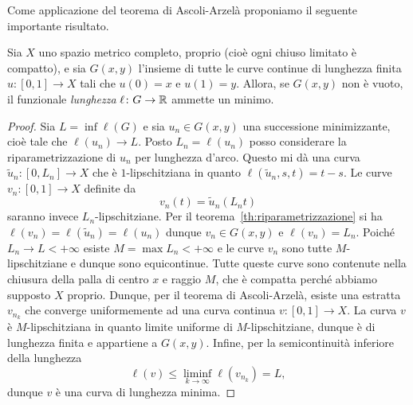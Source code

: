 Come applicazione del teorema di Ascoli-Arzelà
proponiamo il seguente importante risultato.

\begin{theorem}
    Sia $X$ uno spazio metrico completo, proprio 
    (cioè ogni chiuso limitato è compatto), 
    e sia $G(x,y)$ l'insieme di tutte le curve continue di lunghezza finita 
    $u\colon [0,1] \to X$
    tali che $u(0) = x$ e $u(1) = y$.
    Allora, se $G(x,y)$ non è vuoto, il funzionale \emph{lunghezza}
    $\ell\colon G \to {\mathbb R}$ ammette un minimo.
\end{theorem}
\begin{proof}
    Sia $L = \inf\ell(G)$ e sia 
    $u_n\in G(x,y)$ una successione minimizzante,
    cioè tale che $\ell(u_n) \to L$.
    Posto $L_n = \ell(u_n)$ posso considerare la riparametrizzazione 
    di $u_n$ per lunghezza d'arco. 
    Questo mi dà una curva $\tilde u_n \colon [0,L_n] \to X$
    che è $1$-lipschitziana in quanto 
    $\ell(\tilde u_n, s,t) = t-s$.
    Le curve $v_n \colon [0,1] \to X$ definite da
    \[
        v_n(t) = \tilde u_n (L_n t)
    \]
    saranno invece $L_n$-lipschitziane. 
    Per il teorema~\ref{th:riparametrizzazione} si ha $\ell(v_n) = \ell(\tilde u_n) = \ell(u_n)$
    dunque $v_n\in G(x,y)$ e $\ell(v_n) = L_n$.
    Poiché $L_n\to L<+\infty$ esiste $M = \max L_n < +\infty$ 
    e le curve $v_n$ sono tutte $M$-lipschitziane e dunque 
    sono equicontinue. 
    Tutte queste curve sono contenute nella chiusura della 
    palla di centro $x$ e raggio $M$, che è compatta
    perché abbiamo supposto $X$ proprio.
    Dunque, per il teorema di Ascoli-Arzelà, esiste una estratta 
    $v_{n_k}$ che converge uniformemente ad una curva continua
    $v\colon [0,1] \to X$.
    La curva $v$ è $M$-lipschitziana in quanto limite uniforme di 
    $M$-lipschitziane, dunque è di lunghezza finita e 
    appartiene a $G(x,y)$.
    Infine, per la semicontinuità inferiore della lunghezza
    \[
        \ell(v) \le \liminf_{k\to \infty} \ell(v_{n_k}) = L,
    \]
    dunque $v$ è una curva di lunghezza minima.
\end{proof}

